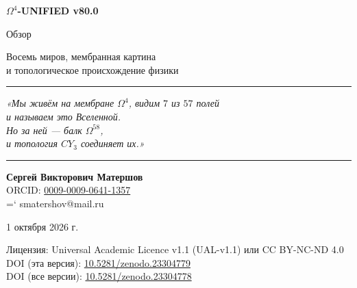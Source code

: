 \documentclass[11pt,a4paper]{article}
\newcommand{\CY}{CY_3}
\newcommand{\Om}{\Omega^4}
\newcommand{\Omfi}{\Omega^{58}}
\renewcommand{\texttt}[1]{{\ttfamily\hyphenchar\font=`\- #1}}
\theoremstyle{definition}
\begin{document}
\begin{center}
{\Huge\bfseries $\Om$-UNIFIED v80.0}

\vspace{0.5cm}

{\Large Обзор}

\vspace{0.3cm}

{\large Восемь миров, мембранная картина \\
и топологическое происхождение физики}

\vspace{1.5cm}

\rule{0.6\textwidth}{0.4pt}

\vspace{1cm}

{\large\itshape
«Мы живём на мембране $\Om$, видим $7$ из $57$ полей \\
и называем это Вселенной. \\
Но за ней — балк $\Omfi$, \\
и топология $\CY$ соединяет их.»
}

\vspace{1cm}

\rule{0.6\textwidth}{0.4pt}

\vspace{1.5cm}

{\large
\textbf{Сергей Викторович Матершов} \\[0.3em]
ORCID: \href{https://orcid.org/0009-0009-0641-1357}{0009-0009-0641-1357} \\[0.3em]
\texttt{smatershov@mail.ru}
}

\vspace{1.5cm}

{\large
1 октября 2026 г.
}

\vspace{1cm}

{\small
Лицензия: Universal Academic Licence v1.1 (UAL-v1.1) или CC BY-NC-ND 4.0 \\[0.2em]
DOI (эта версия): \href{https://doi.org/10.5281/zenodo.23304779}{10.5281/zenodo.23304779} \\[0.2em]
DOI (все версии): \href{https://doi.org/10.5281/zenodo.23304778}{10.5281/zenodo.23304778}
\par}

\end{center}

\vfill

\end{document}
